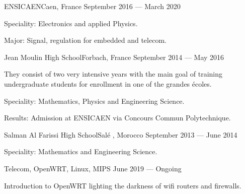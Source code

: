 \documentclass{faresume}
\begin{document}
\begin{column}[\leftcolumnwidth]

            {ENSICAEN}{Caen, France}
            {September 2016 --- March 2020}
            {
                \begin{additems}
                    \item Speciality: Electronics and applied Physics.
                    \item Major: Signal, regulation for embedded and telecom.
                \end{additems}
            }

            {Jean Moulin High School}{Forbach, France}
            {September 2014 --- May 2016}
            {
                \begin{additems}
                    \item They consist of two very intensive years with the main goal of training undergraduate students for enrollment in one of the 
                    {grandes \'ecoles}.
                    \item Speciality: Mathematics, Physics and Engineering Science.
                    \item Results: Admission at ENSICAEN via Concours Commun Polytechnique.
                \end{additems}
            }

            {Salman Al Farissi High School}{Sal\'e , Morocco}
            {September 2013 --- June 2014}
            {
                \begin{additems}
                    \item Speciality: Mathematics and Engineering Science.
                \end{additems}
            }


            {}{Telecom, OpenWRT, Linux, MIPS}
            {June 2019 --- Ongoing}
            {
                \begin{additems}
                    \item Introduction to OpenWRT lighting the darkness of wifi routers and firewalls.
                \end{additems}
            }


\end{column}
\end{document}
